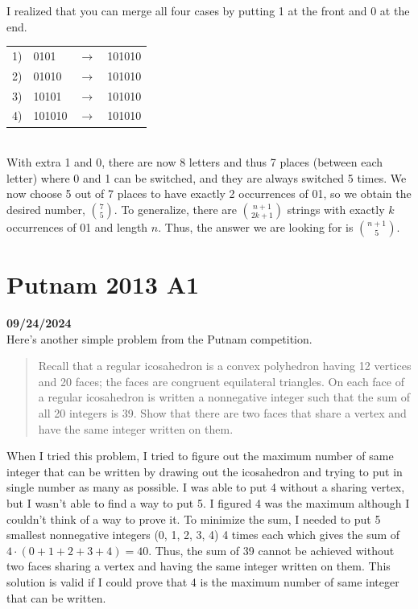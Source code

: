 \documentclass[12pt, oneside]{article}
\begin{document}
\noindent I realized that you can merge all four cases by putting 1 at the front and 0 at the end.\\

\begin{tabular}{c l c l}
1) & 0101 & $\rightarrow$ & 101010\\
2) & 01010 & $\rightarrow$ & 101010\\
3) & 10101 & $\rightarrow$ & 101010\\
4) & 101010 & $\rightarrow$ & 101010\\
\end{tabular}\\

\noindent With extra 1 and 0, there are now 8 letters and thus 7 places (between each letter) where 0 and 1 can be switched, and they are always switched 5 times. We now choose 5 out of 7 places to have exactly 2 occurrences of 01, so we obtain the desired number, $\binom{7}{5}$. To generalize, there are $\binom{n+1}{2k+1}$ strings with exactly $k$ occurrences of 01 and length $n$. Thus, the answer we are looking for is $\binom{n+1}{5}$.
\section*{Putnam 2013 A1}
\textbf{09/24/2024}\\
Here's another simple problem from the Putnam competition. 
\begin{quote}
Recall that a regular icosahedron is a convex polyhedron having 12 vertices and 20 faces; the faces are congruent equilateral triangles. On each face of a regular
icosahedron is written a nonnegative integer such that
the sum of all 20 integers is 39. Show that there are
two faces that share a vertex and have the same integer
written on them.
\end{quote}
When I tried this problem, I tried to figure out the maximum number of same integer that can be written by drawing out the icosahedron and trying to put in single number as many as possible. I was able to put 4 without a sharing vertex, but I wasn't able to find a way to put 5. I figured 4 was the maximum although I couldn't think of a way to prove it. To minimize the sum, I needed to put 5 smallest nonnegative integers (0, 1, 2, 3, 4) 4 times each which gives the sum of $4 \cdot (0 + 1 + 2 + 3 + 4) = 40$. Thus, the sum of 39 cannot be achieved without two faces sharing a vertex and having the same integer written on them. This solution is valid if I could prove that 4 is the maximum number of same integer that can be written.
\end{document}
